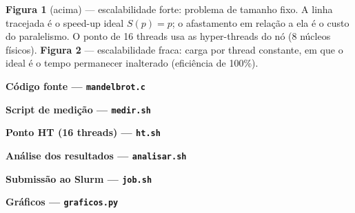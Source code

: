 \documentclass[10pt,a4paper,twocolumn]{article}
\begin{document}
\small
\textbf{Figura 1} (acima) --- escalabilidade forte: problema de tamanho fixo.
A linha tracejada é o speed-up ideal $S(p) = p$; o afastamento em relação a ela
é o custo do paralelismo. O ponto de 16 threads usa as hyper-threads do nó
(8 núcleos físicos).
\textbf{Figura 2} --- escalabilidade fraca: carga por thread constante, em que
o ideal é o tempo permanecer inalterado (eficiência de 100\%).
\normalsize

\newpage
\begin{center}\textbf{\large Código fonte --- \texttt{mandelbrot.c}}\end{center}


\newpage
\begin{center}\textbf{\large Script de medição --- \texttt{medir.sh}}\end{center}


\newpage
\begin{center}\textbf{\large Ponto HT (16 threads) --- \texttt{ht.sh}}\end{center}


\newpage
\begin{center}\textbf{\large Análise dos resultados --- \texttt{analisar.sh}}\end{center}


\newpage
\begin{center}\textbf{\large Submissão ao Slurm --- \texttt{job.sh}}\end{center}


\newpage
\begin{center}\textbf{\large Gráficos --- \texttt{graficos.py}}\end{center}

\end{document}
